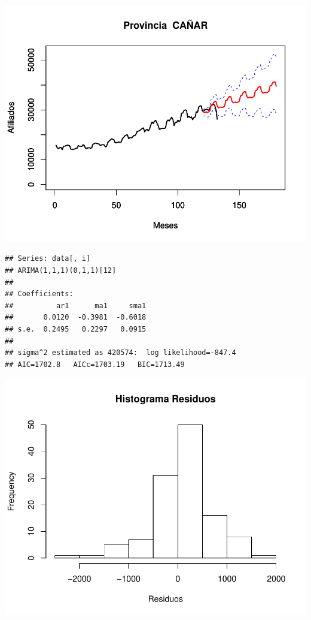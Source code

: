 \documentclass[11pt,a4paper,oneside]{article}\usepackage[]{graphicx}\usepackage[]{color}
\makeatletter
\def\maxwidth{ %
  \ifdim\Gin@nat@width>\linewidth
    \linewidth
  \else
    \Gin@nat@width
  \fi
}
\newenvironment{kframe}{%
 \def\at@end@of@kframe{}%
 \ifinner\ifhmode%
  \def\at@end@of@kframe{\end{minipage}}%
  \begin{minipage}{\columnwidth}%
 \fi\fi%
 \def\FrameCommand##1{\hskip\@totalleftmargin \hskip-\fboxsep
 \colorbox{shadecolor}{##1}\hskip-\fboxsep
     \hskip-\linewidth \hskip-\@totalleftmargin \hskip\columnwidth}%
 \MakeFramed {\advance\hsize-\width
   \@totalleftmargin\z@ \linewidth\hsize
   \@setminipage}}%
 {\par\unskip\endMakeFramed%
 \at@end@of@kframe}
\newenvironment{knitrout}{}{} %
\makeatother
\begin{document}
\begin{knitrout}
{\centering \includegraphics[width=\maxwidth]{figure/unnamed-chunk-16-7} 

}


\begin{kframe}\begin{verbatim}
## Series: data[, i] 
## ARIMA(1,1,1)(0,1,1)[12]                    
## 
## Coefficients:
##          ar1      ma1     sma1
##       0.0120  -0.3981  -0.6018
## s.e.  0.2495   0.2297   0.0915
## 
## sigma^2 estimated as 420574:  log likelihood=-847.4
## AIC=1702.8   AICc=1703.19   BIC=1713.49
\end{verbatim}
\end{kframe}

{\centering \includegraphics[width=\maxwidth]{figure/unnamed-chunk-16-8} 

}
\end{knitrout}
\end{document}
